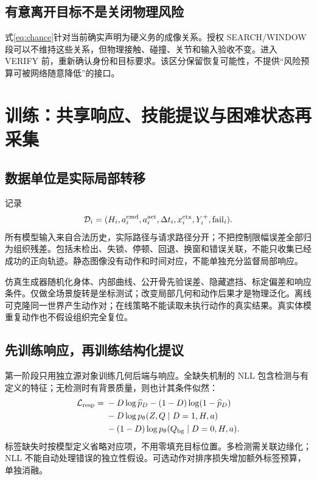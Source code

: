 \documentclass[UTF8,fontset=fandol,11pt,a4paper]{ctexart}
\theoremstyle{plain}
\theoremstyle{definition}
\theoremstyle{remark}
\numberwithin{equation}{section}
\begin{document}
\subsection{有意离开目标不是关闭物理风险}
式\eqref{eq:chance}针对当前确实声明为硬义务的成像关系。授权 SEARCH/WINDOW 段可以不维持这些关系，但物理接触、碰撞、关节和输入验收不变。进入 VERIFY 前，重新确认身份和目标要求。该区分保留恢复可能性，不提供“风险预算可被网络随意降低”的接口。

\section{训练：共享响应、技能提议与困难状态再采集}
\label{sec:training}
\subsection{数据单位是实际局部转移}
记录
\begin{equation}
\mathcal D_i=(H_i,a_i^{\rm cmd},a_i^{\rm act},\Delta t_i,x_i^{\rm ctx},Y_i^+,\mathrm{fail}_i).
\end{equation}
所有模型输入来自合法历史，实际路径与请求路径分开；不把控制限幅误差全部归为组织残差。包括未检出、失锁、停顿、回退、换窗和错误关联，不能只收集已经成功的正向轨迹。静态图像没有动作和时间对应，不能单独充分监督局部响应。

仿真生成器随机化身体、内部曲线、公开骨先验误差、隐藏遮挡、标定偏差和响应条件。仅做全场景旋转是坐标测试；改变局部几何和动作后果才是物理泛化。离线可克隆同一世界产生动作对；在线策略不能读取未执行动作的真实结果。真实体模重复动作也不假设组织完全复位。

\subsection{先训练响应，再训练结构化提议}
第一阶段只用独立源对象训练几何后端与响应。全缺失机制的 NLL 包含检测与有定义的特征；无检测时有背景质量，则也计其条件似然：
\begin{equation}
\begin{split}
\mathcal L_{\rm resp}={}&-D\log\widehat p_D-(1-D)\log(1-\widehat p_D)\\
&-D\log p_\theta(Z,Q\mid D=1,H,a)\\
&-(1-D)\log p_\theta(Q_{\rm bg}\mid D=0,H,a).
\end{split}
\end{equation}
标签缺失时按模型定义省略对应项，不用零填充目标位置。多检测需关联边缘化；NLL 不能自动处理错误的独立性假设。可选动作对排序损失增加额外标签预算，单独消融。
\end{document}
